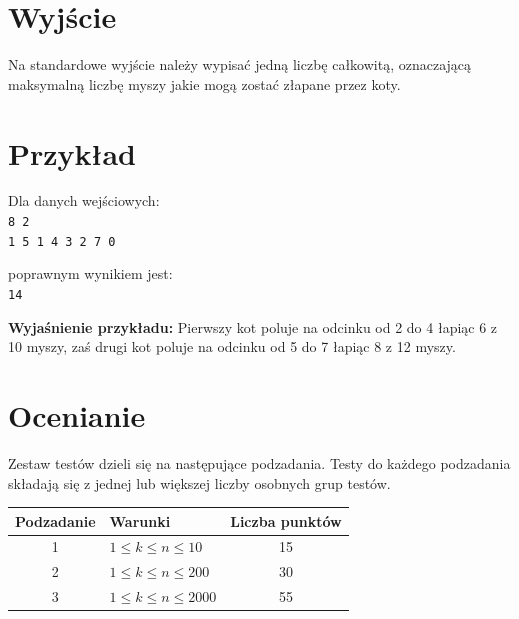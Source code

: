 \documentclass[10pt]{article}
\begin{document}

    \section*{Wyjście}
    
    Na standardowe wyjście należy wypisać jedną liczbę całkowitą, oznaczającą maksymalną liczbę myszy jakie mogą zostać złapane przez koty.


    \section*{Przykład}
    
    \noindent
    \begin{minipage}[t]{0.5\textwidth}
        Dla danych wejściowych:\vspace{1ex}\\
        \texttt{8 2\\1 5 1 4 3 2 7 0}
    \end{minipage}
    \begin{minipage}[t]{0.5\textwidth}
        poprawnym wynikiem jest:\vspace{1ex}\\
        \texttt{14}
    \end{minipage}
    
    \vspace{2ex}
    \noindent\textbf{Wyjaśnienie przykładu:} Pierwszy kot poluje na odcinku od 2 do 4 łapiąc 6 z 10 myszy, zaś drugi kot poluje na odcinku od 5 do 7 łapiąc 8 z 12 myszy.
    

    \section*{Ocenianie}
        
    Zestaw testów dzieli się na następujące podzadania. Testy do każdego podzadania składają się z jednej lub większej liczby osobnych grup testów.
    
    \begin{center}
        \begin{tabular}{ |c|p{9cm}|c| }
            \hline
            \textbf{Podzadanie} & \textbf{Warunki} & \textbf{Liczba punktów}\\
            \hline
            1 & $1 \leq k \leq n \leq 10$ & 15\\
            \hline
            2 & $1 \leq k \leq n \leq 200$ & 30\\
            \hline
            3 & $1 \leq k \leq n \leq 2000$ & 55\\
            \hline
        \end{tabular}
    \end{center}
\end{document}
